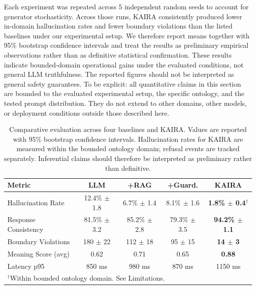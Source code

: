 \documentclass[11pt,a4paper]{article}
\begin{document}
Each experiment was repeated across 5 independent random seeds to account for generator stochasticity. Across those runs, KAIRA consistently produced lower in-domain hallucination rates and fewer boundary violations than the listed baselines under our experimental setup. We therefore report means together with 95\% bootstrap confidence intervals and treat the results as preliminary empirical observations rather than as definitive statistical confirmation. These results indicate bounded-domain operational gains under the evaluated conditions, not general LLM truthfulness. The reported figures should not be interpreted as general safety guarantees. To be explicit: all quantitative claims in this section are bounded to the evaluated experimental setup, the specific ontology, and the tested prompt distribution. They do not extend to other domains, other models, or deployment conditions outside those described here.

\clearpage
\begin{table}[h]
\centering
\caption{Comparative evaluation across four baselines and KAIRA. Values are reported with 95\% bootstrap confidence intervals. Hallucination rates for KAIRA are measured within the bounded ontology domain; refusal events are tracked separately. Inferential claims should therefore be interpreted as preliminary rather than definitive.}
\label{tab:results}
\begin{tabular}{lcccc}
\toprule
\textbf{Metric} & \textbf{LLM} & \textbf{+RAG} & \textbf{+Guard.} & \textbf{KAIRA} \\
\midrule
Hallucination Rate        & 12.4\% $\pm$ 1.8 & 6.7\% $\pm$ 1.4 & 8.1\% $\pm$ 1.6 & \textbf{1.8\% $\pm$ 0.4}$^\dagger$ \\
Response Consistency      & 81.5\% $\pm$ 3.2 & 85.2\% $\pm$ 2.8 & 79.3\% $\pm$ 3.5 & \textbf{94.2\% $\pm$ 1.1} \\
Boundary Violations       & 180 $\pm$ 22      & 112 $\pm$ 18     & 95 $\pm$ 15      & \textbf{14 $\pm$ 3} \\
Meaning Score (avg)       & 0.62              & 0.71             & 0.65             & \textbf{0.88} \\
Latency p95               & 850 ms            & 980 ms           & 870 ms           & 1150 ms \\
\bottomrule
\multicolumn{5}{l}{\footnotesize $^\dagger$Within bounded ontology domain. See Limitations.}
\end{tabular}
\end{table}
\end{document}

